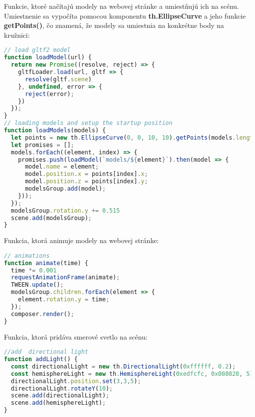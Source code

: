         Funkcie, ktoré načítajú modely na webovej stránke a umiestňujú ich na scénu. Umiestnenie sa vypočíta pomocou komponentu \textbf{th.EllipseCurve} a jeho funkcie \textbf{getPoints()}, čo znamená, že modely sa umiestnia na konkrétne body na kružnici:
\begin{lstlisting}[language=javascript]
// load gltf2 model
function loadModel(url) {
  return new Promise((resolve, reject) => {
    gltfLoader.load(url, gltf => {
      resolve(gltf.scene)
    }, undefined, error => {
      reject(error);
    })
  });
}
// loading models and setup the startup position
function loadModels(models) {
  let points = new th.EllipseCurve(0, 0, 10, 10).getPoints(models.length);
  let promises = [];
  models.forEach((element, index) => {
    promises.push(loadModel(`models/${element}`).then(model => {
      model.name = element;
      model.position.x = points[index].x;
      model.position.z = points[index].y;
      modelsGroup.add(model);
    }));
  });
  modelsGroup.rotation.y += 0.515
  scene.add(modelsGroup);
}
\end{lstlisting}

        Funkcia, ktorá animuje modely na webovej stránke:
\begin{lstlisting}[language=javascript]
// animations
function animate(time) {
  time *= 0.001
  requestAnimationFrame(animate);
  TWEEN.update();
  modelsGroup.children.forEach(element => {
    element.rotation.y = time;
  });
  composer.render();
}
\end{lstlisting}

        Funkcia, ktorá pridáva smerové svetlo na scénu:
\begin{lstlisting}[language=javascript]
//add  directional light
function addLight() {
  const directionalLight = new th.DirectionalLight(0xffffff, 0.2);
  const hemisphereLight = new th.HemisphereLight(0xedfcfc, 0x080820, 5);
  directionalLight.position.set(3,3,5);
  directionalLight.rotateY(10);
  scene.add(directionalLight);
  scene.add(hemisphereLight);
}
\end{lstlisting}

